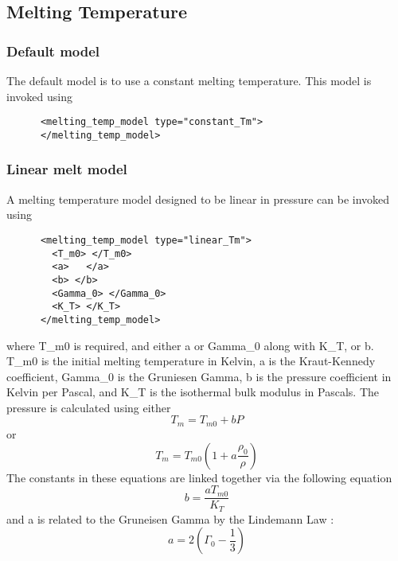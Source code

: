 \subsection{Melting Temperature}
  \subsubsection{Default model}
  The default model is to use a constant melting temperature.  This model
  is invoked using
  \begin{lstlisting}
      <melting_temp_model type="constant_Tm">
      </melting_temp_model>
  \end{lstlisting}

  \subsubsection{Linear melt model}
  A melting temperature model designed to be linear in pressure can be invoked using
  \begin{lstlisting}
      <melting_temp_model type="linear_Tm">
        <T_m0> </T_m0>
        <a>   </a>
        <b> </b>
        <Gamma_0> </Gamma_0>
        <K_T> </K_T>
      </melting_temp_model>
  \end{lstlisting}

  where T\_m0 is required, and either a or Gamma\_0 along with K\_T, or b.  
  T\_m0 is the initial melting temperature in Kelvin, a is the Kraut-Kennedy coefficient,
  Gamma\_0 is the Gruniesen Gamma, b is the pressure coefficient in Kelvin per Pascal, and K\_T
  is the isothermal bulk modulus in Pascals.
  The pressure is calculated using either
  \begin{equation}
    T_{m}=T_{m0}+bP
  \end{equation}
  or
  \begin{equation}
    T_{m}=T_{m0}\left(1+a\frac{\rho_0}{\rho}\right)
  \end{equation}
  The constants in these equations are linked together via the following equation
  \begin{equation}
   b=\frac{aT_{m0}}{K_T}
  \end{equation}
  and a is related to the Gruneisen Gamma by the Lindemann Law \cite{Poirier91}:
  \begin{equation}
   a=2\left(\Gamma_0-\frac{1}{3}\right)
  \end{equation}

  


